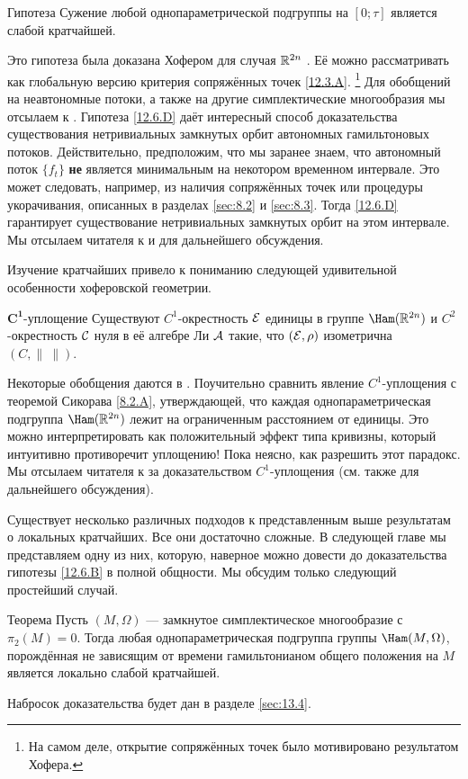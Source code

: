 \begin{thm}{Гипотеза}\label{12.6.D}
Сужение любой однопараметрической подгруппы на $[0;\tau]$ является
слабой кратчайшей. 
\end{thm}

Это гипотеза была доказана Хофером для случая $\mathbb{R}^{2n}$
\cite{H2}. 
Её можно рассматривать как глобальную версию критерия сопряжённых
точек \ref{12.3.A}.%
\footnote{На самом деле, открытие сопряжённых точек было мотивировано
  результатом Хофера.}  
Для обобщений на неавтономные потоки, а также на другие
симплектические многообразия мы отсылаем к
\cite{BP1,
  Si1,LM2,Sch3,MSl}. 
Гипотеза \ref{12.6.D} даёт интересный способ доказательства
существования нетривиальных замкнутых орбит автономных гамильтоновых
потоков. 
Действительно, предположим, что мы заранее знаем, что автономный поток
$\{f_t\}$ \textbf{не} является минимальным на некотором временном
интервале.
Это может следовать, например, из наличия сопряжённых точек или
процедуры укорачивания, описанных в разделах \ref{sec:8.2} и
\ref{sec:8.3}. 
Тогда \ref{12.6.D} гарантирует существование нетривиальных замкнутых
орбит на этом интервале. 
Мы отсылаем читателя к \cite{LM2} и \cite{P8} для
дальнейшего обсуждения. 

Изучение кратчайших привело к пониманию следующей удивительной
особенности хоферовской геометрии. 

\begin{thm}[\cite{BP1}.]{$\bm{C^1}$-уплощение}
\label{12.6.E}
Существуют $C^1$-окрестность $\mathcal{E}$ единицы в группе $\Ham(\RR^{2n})$ и
$C^2$-окрестность $\mathcal{C}$ нуля в её алгебре Ли $\mathcal{A}$ такие, что $(\mathcal{E},
\rho)$ изометрична $(C, \|\ \|)$. 
\end{thm}

Некоторые обобщения даются в \cite{LM2}.
Поучительно сравнить явление $C^1$-уплощения с теоремой
Сикорава \ref{8.2.A}, утверждающей, что каждая
однопараметрическая подгруппа $\Ham(\RR^{2n})$ лежит на ограниченным
расстоянием от единицы. 
Это можно интерпретировать как положительный эффект типа кривизны,
который интуитивно противоречит уплощению! 
Пока неясно, как разрешить этот парадокс.
Мы отсылаем читателя к \cite{BP1,HZ} за доказательством
$C^1$-уплощения (см. также \cite{P8} для дальнейшего обсуждения). 

Существует несколько различных подходов к представленным выше
результатам о локальных кратчайших. 
Все они достаточно сложные.
В следующей главе мы представляем одну из них, которую, наверное можно
довести до доказательства гипотезы \ref{12.6.B} в полной общности. 
Мы обсудим только следующий простейший случай.

\begin{thm}{Теорема}\label{12.6.F}
Пусть $(M, \Omega)$ — замкнутое симплектическое многообразие с $\pi_2(M) = 0$.
Тогда любая однопараметрическая подгруппа группы $\Ham(M, \Omega)$,
порождённая не зависящим от времени гамильтонианом общего положения на
$M$ является локально слабой кратчайшей. 
\end{thm}

Набросок доказательства будет дан в разделе \ref{sec:13.4}.
